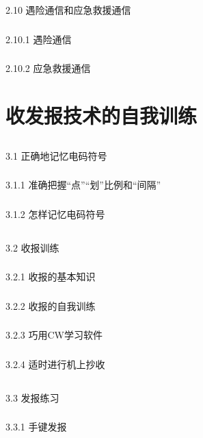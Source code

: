 \documentclass[12pt,UTF8]{ctexbook}
\begin{document}
\section{}2.10 遇险通信和应急救援通信
\subsection{}2.10.1 遇险通信
\subsection{}2.10.2 应急救援通信

\chapter{收发报技术的自我训练}

\section{}3.1 正确地记忆电码符号
\subsection{}3.1.1 准确把握“点”“划”比例和“间隔”
\subsection{}3.1.2 怎样记忆电码符号
\section{}3.2 收报训练
\subsection{}3.2.1 收报的基本知识
\subsection{}3.2.2 收报的自我训练
\subsection{}3.2.3 巧用CW学习软件
\subsection{}3.2.4 适时进行机上抄收
\section{}3.3 发报练习
\subsection{}3.3.1 手键发报
\end{document}
